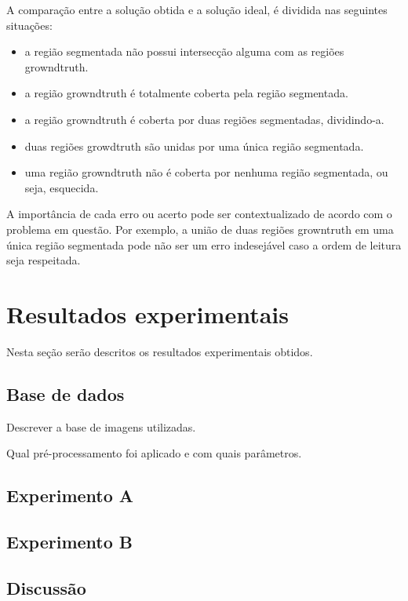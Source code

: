 \documentclass[a4paper,11pt]{article}
\begin{document}
      A comparação entre a solução obtida e a solução ideal, é dividida nas seguintes situações:

      \begin{itemize}
        \item a região segmentada não possui intersecção alguma com as regiões growndtruth.
        \item a região growndtruth é totalmente coberta pela região segmentada.
        \item a região growndtruth é coberta por duas regiões segmentadas, dividindo-a.
        \item duas regiões growdtruth são unidas por uma única região segmentada.
        \item uma região growndtruth não é coberta por nenhuma região segmentada, ou seja, esquecida.
      \end{itemize}

      A importância de cada erro ou acerto pode ser contextualizado de acordo com o problema em questão. Por exemplo, a união de duas regiões growntruth em uma única região segmentada pode não ser um erro indesejável caso a ordem de leitura seja respeitada.





\section{Resultados experimentais}

Nesta seção serão descritos os resultados experimentais obtidos.

\subsection{Base de dados}
Descrever a base de imagens utilizadas.

Qual pré-processamento foi aplicado e com quais parâmetros.


\subsection{Experimento A}

\subsection{Experimento B}


\subsection{Discussão}
\end{document}
